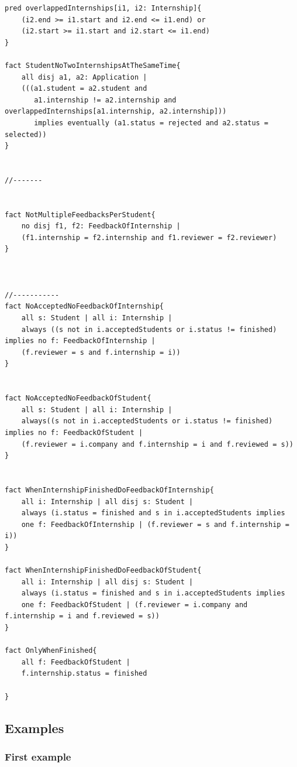 \documentclass{article}
\begin{document}
\begin{lstlisting}[language=Alloy,label=lst:sigs]
pred overlappedInternships[i1, i2: Internship]{
	(i2.end >= i1.start and i2.end <= i1.end) or
	(i2.start >= i1.start and i2.start <= i1.end)
}

fact StudentNoTwoInternshipsAtTheSameTime{
	all disj a1, a2: Application |
	(((a1.student = a2.student and 
	   a1.internship != a2.internship and overlappedInternships[a1.internship, a2.internship])) 
	   implies eventually (a1.status = rejected and a2.status = selected))
}


//-------


fact NotMultipleFeedbacksPerStudent{
	no disj f1, f2: FeedbackOfInternship |	
	(f1.internship = f2.internship and f1.reviewer = f2.reviewer)
}



//-----------
fact NoAcceptedNoFeedbackOfInternship{
	all s: Student | all i: Internship |
	always ((s not in i.acceptedStudents or i.status != finished) implies no f: FeedbackOfInternship | 
	(f.reviewer = s and f.internship = i)) 
}


fact NoAcceptedNoFeedbackOfStudent{
	all s: Student | all i: Internship |
	always((s not in i.acceptedStudents or i.status != finished) implies no f: FeedbackOfStudent | 
	(f.reviewer = i.company and f.internship = i and f.reviewed = s)) 
}


fact WhenInternshipFinishedDoFeedbackOfInternship{
	all i: Internship | all disj s: Student |
	always (i.status = finished and s in i.acceptedStudents implies
	one f: FeedbackOfInternship | (f.reviewer = s and f.internship = i))
}

fact WhenInternshipFinishedDoFeedbackOfStudent{
	all i: Internship | all disj s: Student |
	always (i.status = finished and s in i.acceptedStudents implies
	one f: FeedbackOfStudent | (f.reviewer = i.company and f.internship = i and f.reviewed = s))
}

fact OnlyWhenFinished{
	all f: FeedbackOfStudent |
	f.internship.status = finished

}

\end{lstlisting}

\newpage

\subsection{Examples}

\subsubsection{First example}
\end{document}
